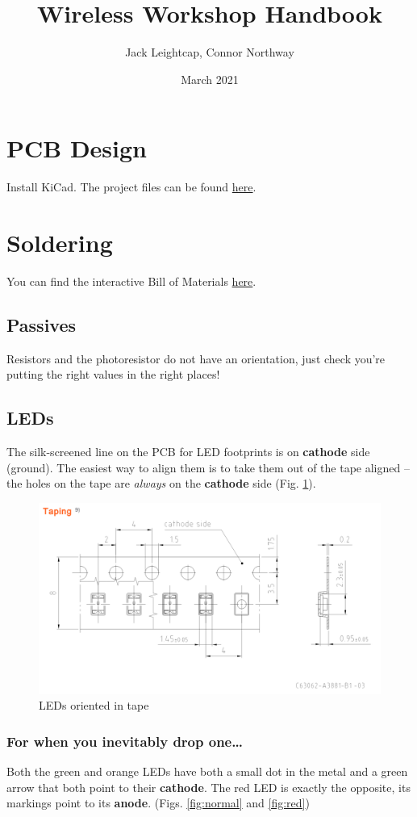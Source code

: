 \documentclass{article}
\title{Wireless Workshop Handbook}
\author{Jack Leightcap, Connor Northway}
\date{March 2021}
\begin{document}
\maketitle

\section{PCB Design}
Install KiCad. The project files can be found \href{https://github.com/cnorthway/d1-sensor-shield}{here}.

\section{Soldering}
You can find the interactive Bill of Materials \href{http://www1.coe.neu.edu/~cnorthwa/ibom.html}{here}.

\subsection{Passives}
Resistors and the photoresistor do not have an orientation, just check you're putting the right values in the right places!
\subsection{LEDs}
The silk-screened line on the PCB for LED footprints is on \textbf{cathode} side (ground).
The easiest way to align them is to take them out of the tape aligned -- the holes on the tape are \emph{always} on the \textbf{cathode} side (Fig. \ref{fig:ledtape}).
\begin{figure}[H]
	\centering
	\includegraphics[width=12cm]{ledtape.png}
	\caption{LEDs oriented in tape}
	\label{fig:ledtape}
\end{figure}

\subsubsection{For when you inevitably drop one\ldots}
Both the green and orange LEDs have both a small dot in the metal and a green arrow that both point to their \textbf{cathode}.
The red LED is exactly the opposite, its markings point to its \textbf{anode}.
(Figs. \ref{fig:normal} and \ref{fig:red})
\end{document}
